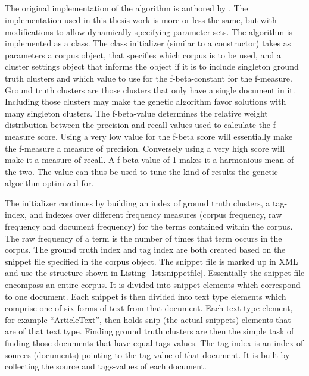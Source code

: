 \subsection{\CTC}
The original implementation of the \CTC algorithm is authored by \supervisor. The implementation used in this thesis work is more or less the same, but with modifications to allow dynamically specifying parameter sets. The \CTC algorithm is implemented as a class. The class initializer (similar to a constructor) takes as parameters a corpus object, that specifies which corpus is to be used, and a cluster settings object that informs the \CTC object if it is to include singleton ground truth clusters and which value to use for the f-beta-constant for the f-measure. Ground truth clusters are those clusters that only have a single document in it. Including those clusters may make the genetic algorithm favor solutions with many singleton clusters. The f-beta-value determines the relative weight distribution between the precision and recall values used to calculate the f-measure score. Using a very low value for the f-beta score will essentially make the f-measure a measure of precision. Conversely using a very high score will make it a measure of recall. A f-beta value of 1 makes it a harmonious mean of the two. The value can thus be used to tune the kind of results the genetic algorithm optimized for.

The initializer continues by building an index of ground truth clusters, a tag-index, and indexes over different frequency measures (corpus frequency, raw frequency and document frequency) for the terms contained within the corpus. The raw frequency of a term is the number of times that term occurs in the corpus. The ground truth index and tag index are both created based on the snippet file specified in the corpus object. The snippet file is marked up in XML and use the structure shown in Listing~\ref{lst:snippetfile}. Essentially the snippet file encompass an entire corpus. It is divided into snippet elements which correspond to one document. Each snippet is then divided into text type elements which comprise one of six forms of text from that document. Each text type element, for example ``ArticleText'', then holds snip (the actual snippets) elements that are of that text type. Finding ground truth clusters are then the simple task of finding those documents that have equal tags-values. The tag index is an index of sources (documents) pointing to the tag value of that document. It is built by collecting the source and tags-values of each document.

